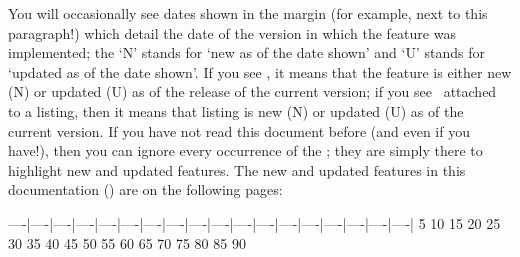 \begin{cmh}
 You will occasionally see dates shown in the margin (for example, next to this
 paragraph!)  which detail the date of the version in
 which the feature was implemented; the `N' stands for `new as of the date shown' and `U'
 stands for `updated as of the date shown'. If you see \stardemo, it means that the
 feature is either new (N) or updated (U) as of the release of the current version; if
 you see \stardemo\, attached to a listing, then it means that listing is new (N) or
 updated (U) as of the current version. If you have not read this document before (and
 even if you have!), then you can ignore every occurrence of the \stardemo; they are
 simply there to highlight new and updated features. The new and updated features in this
 documentation (\gitRel) are on the following pages: \listOfNewFeatures%
\end{cmh}
----|----|----|----|----|----|----|----|----|----|----|----|----|----|----|----|----|----|
   5   10   15   20   25   30   35   40   45   50   55   60   65   70   75   80   85   90